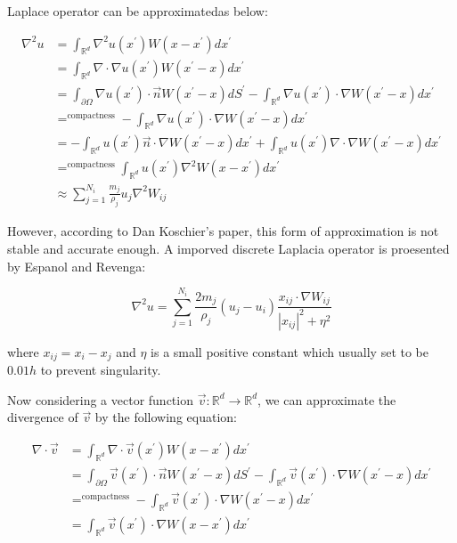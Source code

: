 \documentclass[10pt, oneside]{article}
\newcommand{\R}{\mathbb{R}}
\begin{document}
Laplace operator can be approximatedas below:

\begin{equation}
    \begin{aligned}
        \nabla^2 u &= \int_{\R^d} \nabla^2 u(x^\prime) W(x-x^\prime) dx^\prime\\
        &= \int_{\R^d} \nabla \cdot \nabla u(x^\prime) W(x^\prime - x) dx^\prime\\
        &= \int_{\partial \Omega} \nabla u(x^\prime) \cdot \vec{n} W(x^\prime - x) dS^\prime -
        \int_{\R^d} \nabla u(x^\prime) \cdot \nabla W(x^\prime - x) dx^\prime\\
        &\mathop{=}^\text{compactness} -\int_{\R^d} \nabla u(x^\prime) \cdot \nabla W(x^\prime - x) dx^\prime\\
        &= -\int_{\R^d} u(x^\prime)\vec{n} \cdot \nabla W(x^\prime - x) dx^\prime +
        \int_{\R^d} u(x^\prime) \nabla \cdot \nabla W(x^\prime - x) dx^\prime\\
        &\mathop{=}^\text{compactness} \int_{\R^d} u(x^\prime) \nabla^2 W(x - x^\prime) dx^\prime\\
        &\approx \sum_{j=1}^{N_i} \frac{m_j}{\rho_j} u_j \nabla^2 W_{ij}
    \end{aligned}
\end{equation}

However, according to Dan Koschier's paper, 
this form of approximation is not stable and accurate enough. 
A imporved discrete Laplacia operator is proesented by Espanol and Revenga: 

\begin{equation}
    \nabla^2 u  = \sum_{j=1}^{N_i} \frac{2m_j}{\rho_j}
    (u_j-u_i) \frac{x_{ij}\cdot \nabla W_{ij}}{|x_{ij}|^2 + \eta^2}
\end{equation}

where $x_{ij} = x_i - x_j$ and $\eta$ is a small positive constant which 
usually set to be $0.01h$ to prevent singularity.

Now considering a vector function $\vec{v}: \R^d \to \R^d$, 
we can approximate the divergence of $\vec{v}$ by the following equation:

\begin{equation}
    \begin{aligned}
        \nabla \cdot \vec{v} &= \int_{\R^d} \nabla \cdot \vec{v}(x^\prime) W(x-x^\prime) dx^\prime\\
        &= \int_{\partial \Omega} \vec{v}(x^\prime) \cdot \vec{n} W(x^\prime - x) dS^\prime -
        \int_{\R^d} \vec{v}(x^\prime) \cdot \nabla W(x^\prime - x) dx^\prime\\
        &\mathop{=}^\text{compactness} -\int_{\R^d} \vec{v}(x^\prime) \cdot \nabla W(x^\prime - x) dx^\prime\\
        &= \int_{\R^d} \vec{v}(x^\prime) \cdot \nabla W(x - x^\prime) dx^\prime\\
    \end{aligned}
\end{equation}
\end{document}
